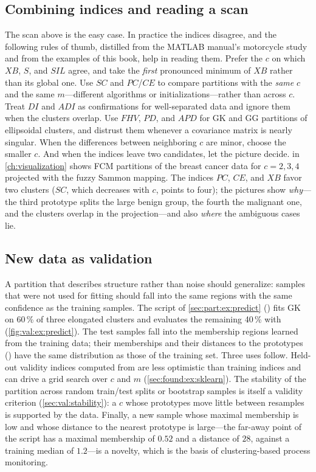 \subsection{Combining indices and reading a scan}\label{sec:val:ex:combine}

The scan above is the easy case. In practice the indices disagree, and the following rules of thumb, distilled from the MATLAB manual's motorcycle study and from the examples of this book, help in reading them. Prefer the $c$ on which $XB$, $S$, and $SIL$ agree, and take the \emph{first} pronounced minimum of $XB$ rather than its global one. Use $SC$ and $PC$/$CE$ to compare partitions with the \emph{same} $c$ and the same $m$---different algorithms or initializations---rather than across $c$. Treat $DI$ and $ADI$ as confirmations for well-separated data and ignore them when the clusters overlap. Use $FHV$, $PD$, and $APD$ for GK and GG partitions of ellipsoidal clusters, and distrust them whenever a covariance matrix is nearly singular. When the differences between neighboring $c$ are minor, choose the smaller $c$. And when the indices leave two candidates, let the picture decide.  in \cref{ch:visualization} shows FCM partitions of the breast cancer data for $c=2,3,4$ projected with the fuzzy Sammon mapping. The indices $PC$, $CE$, and $XB$ favor two clusters ($SC$, which decreases with $c$, points to four); the pictures show \emph{why}---the third prototype splits the large benign group, the fourth the malignant one, and the clusters overlap in the projection---and also \emph{where} the ambiguous cases lie.

\subsection{New data as validation}\label{sec:val:ex:predict}

A partition that describes structure rather than noise should generalize: samples that were not used for fitting should fall into the same regions with the same confidence as the training samples. The script of \cref{sec:part:ex:predict} () fits GK on 60\,\% of three elongated clusters and evaluates the remaining 40\,\% with  (\cref{fig:val:ex:predict}). The test samples fall into the membership regions learned from the training data; their memberships and their distances to the prototypes () have the same distribution as those of the training set. Three uses follow. Held-out validity indices computed from  are less optimistic than training indices and can drive a grid search over $c$ and $m$ (\cref{sec:found:ex:sklearn}). The stability of the partition across random train/test splits or bootstrap samples is itself a validity criterion (\cref{sec:val:stability}): a $c$ whose prototypes move little between resamples is supported by the data. Finally, a new sample whose maximal membership is low and whose distance to the nearest prototype is large---the far-away point of the script has a maximal membership of $0.52$ and a distance of $28$, against a training median of $1.2$---is a novelty, which is the basis of clustering-based process monitoring.

